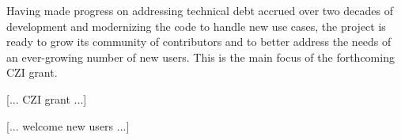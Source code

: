
Having made progress on addressing technical debt accrued over two decades of
development and modernizing the code to handle new use cases, the project
is ready to grow its community of contributors and to better address the needs
of an ever-growing number of new users.  This is the main focus of the
forthcoming CZI grant.

[... CZI grant ...]

[... welcome new users ...]






